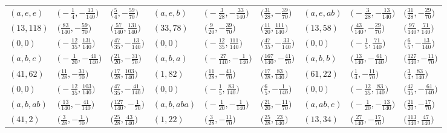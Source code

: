 \documentclass[10pt,a4paper]{amsart}
\theoremstyle{definition}
\numberwithin{equation}{section}
\begin{document}
\begin{landscape}
\begin{table}[th]
\begin{tabular}{|lll|lll|lll|}
\\\hline
$(a, e, e)$ & $\bigl(-\frac{1}{4}, -\frac{13}{140}\bigr)$ & $\bigl(\frac{5}{4}, -\frac{59}{70}\bigr)$ & $(a, e, b)$ & $\bigl(-\frac{3}{28}, -\frac{33}{140}\bigr)$ & $\bigl(\frac{31}{28}, -\frac{39}{70}\bigr)$ & $(a, e, ab)$ & $\bigl(-\frac{3}{28}, -\frac{13}{140}\bigr)$ & $\bigl(\frac{31}{28}, -\frac{29}{70}\bigr)$
\\
$(13, 118)$ & $\bigl(\frac{83}{140}, -\frac{59}{70}\bigr)$ & $\bigl(\frac{57}{140}, \frac{131}{140}\bigr)$ & $(33, 78)$ & $\bigl(\frac{9}{20}, -\frac{39}{70}\bigr)$ & $\bigl(\frac{11}{20}, \frac{111}{140}\bigr)$ & $(13, 58)$ & $\bigl(\frac{43}{140}, -\frac{29}{70}\bigr)$ & $\bigl(\frac{97}{140}, \frac{71}{140}\bigr)$
\\
$(0, 0)$ & $\bigl(-\frac{12}{35}, \frac{131}{140}\bigr)$ & $\bigl(\frac{47}{35}, -\frac{13}{140}\bigr)$ & $(0, 0)$ & $\bigl(-\frac{12}{35}, \frac{111}{140}\bigr)$ & $\bigl(\frac{47}{35}, -\frac{33}{140}\bigr)$ & $(0, 0)$ & $\bigl(-\frac{1}{5}, \frac{71}{140}\bigr)$ & $\bigl(\frac{6}{5}, -\frac{13}{140}\bigr)$
\\\hline
$(a, b, e)$ & $\bigl(-\frac{1}{20}, -\frac{41}{140}\bigr)$ & $\bigl(\frac{21}{20}, -\frac{31}{70}\bigr)$ & $(a, b, a)$ & $\bigl(-\frac{27}{140}, -\frac{1}{140}\bigr)$ & $\bigl(\frac{167}{140}, -\frac{41}{70}\bigr)$ & $(a, b, b)$ & $\bigl(\frac{13}{140}, -\frac{61}{140}\bigr)$ & $\bigl(\frac{127}{140}, -\frac{11}{70}\bigr)$
\\
$(41, 62)$ & $\bigl(\frac{11}{28}, -\frac{31}{70}\bigr)$ & $\bigl(\frac{17}{28}, \frac{103}{140}\bigr)$ & $(1, 82)$ & $\bigl(\frac{11}{28}, -\frac{41}{70}\bigr)$ & $\bigl(\frac{17}{28}, \frac{83}{140}\bigr)$ & $(61, 22)$ & $\bigl(\frac{1}{4}, -\frac{11}{70}\bigr)$ & $\bigl(\frac{3}{4}, \frac{83}{140}\bigr)$
\\
$(0, 0)$ & $\bigl(-\frac{12}{35}, \frac{103}{140}\bigr)$ & $\bigl(\frac{47}{35}, -\frac{41}{140}\bigr)$ & $(0, 0)$ & $\bigl(-\frac{1}{5}, \frac{83}{140}\bigr)$ & $\bigl(\frac{6}{5}, -\frac{1}{140}\bigr)$ & $(0, 0)$ & $\bigl(-\frac{12}{35}, \frac{83}{140}\bigr)$ & $\bigl(\frac{47}{35}, -\frac{61}{140}\bigr)$
\\\hline
$(a, b, ab)$ & $\bigl(\frac{13}{140}, -\frac{41}{140}\bigr)$ & $\bigl(\frac{127}{140}, -\frac{1}{70}\bigr)$ & $(a, b, aba)$ & $\bigl(-\frac{1}{20}, -\frac{1}{140}\bigr)$ & $\bigl(\frac{21}{20}, -\frac{11}{70}\bigr)$ & $(a, ab, e)$ & $\bigl(-\frac{1}{20}, -\frac{13}{140}\bigr)$ & $\bigl(\frac{21}{20}, -\frac{17}{70}\bigr)$
\\
$(41, 2)$ & $\bigl(\frac{3}{28}, -\frac{1}{70}\bigr)$ & $\bigl(\frac{25}{28}, \frac{43}{140}\bigr)$ & $(1, 22)$ & $\bigl(\frac{3}{28}, -\frac{11}{70}\bigr)$ & $\bigl(\frac{25}{28}, \frac{23}{140}\bigr)$ & $(13, 34)$ & $\bigl(\frac{27}{140}, -\frac{17}{70}\bigr)$ & $\bigl(\frac{113}{140}, \frac{47}{140}\bigr)$

\end{tabular}
\end{table}
\end{landscape}
\end{document}
